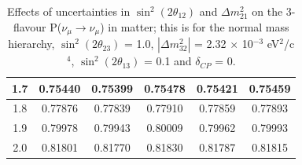 \begin{table}
\begin{tabular}{| c | c | c | c | c | c |}
\hline
1.7 &  0.75440 &  0.75399 &  0.75478 &  0.75421 &  0.75459 \\
\hline
1.8 &  0.77876 &  0.77839 &  0.77910 &  0.77859 &  0.77893 \\
\hline
1.9 &  0.79978 &  0.79943 &  0.80009 &  0.79962 &  0.79993 \\
\hline
2.0 &  0.81801 &  0.81770 &  0.81830 &  0.81787 &  0.81815 \\
\hline
\end{tabular}
\caption{
  Effects of uncertainties in $\sin^{2}(2 \theta_{12})$ and $\Delta m_{21}^{2}$ 
  on the 3-flavour P($\nu_{\mu} \rightarrow \nu_{\mu}$) in matter; this is for the normal mass hierarchy, $\sin^{2}(2 \theta_{23})$ = 1.0, 
  $|\Delta m_{32}^{2}|$ = 2.32 $\times$ 10$^{-3}$ eV$^{2}$/c$^{4}$, $\sin^{2}(2 \theta_{13})$ = 0.1 and $\delta_{CP}$ = 0.
}
\label{numuSurvProbEffectError12}
\end{table}

\clearpage


